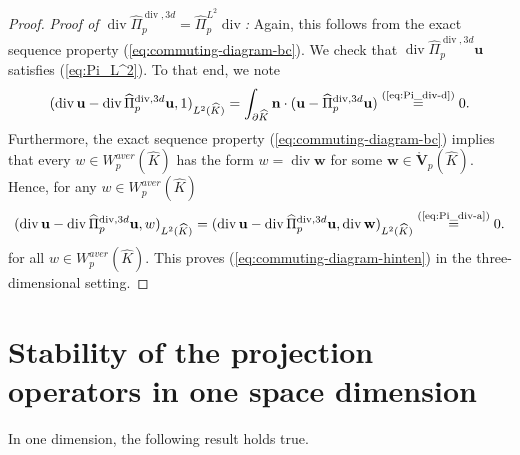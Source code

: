 \documentclass{article}
\newcommand{\hatPidivcom}{\widehat\Pi^{\operatorname*{div},3d}_{p}}
\begin{document}
\begin{proof}
\emph{Proof of $\operatorname*{div}\hatPidivcom=\widehat{\Pi}_{p}^{L^{2}}\operatorname*{div}$:} Again, this 
follows from the exact sequence property (\ref{eq:commuting-diagram-bc}). We check that
$\operatorname*{div}\hatPidivcom\mathbf{u}$
satisfies (\ref{eq:Pi_L^2}). To that end, we note
\begin{equation*}
(\operatorname*{div}{\mathbf{u}}-\operatorname*{div}\hatPidivcom{\mathbf{u}},1)_{L^{2}(\widehat{K})}%
=\int_{\partial\widehat{K}}\mathbf{n}\cdot({\mathbf{u}}-\hatPidivcom{\mathbf{u}})\overset{\text{(\ref{eq:Pi_div-d}%
)}}{=}0.
\end{equation*}
Furthermore, the exact sequence property (\ref{eq:commuting-diagram-bc}) implies 
that every $w\in W^{aver}_{p}(\widehat{K})$ has the form
$w=\operatorname*{div}{\mathbf{w}}$ for some $\mathbf{w}\in\mathring{\mathbf{V}}_{p}(\widehat{K})$. 
Hence,  for any $w \in W^{aver}_p(\widehat{K})$
\[
(\operatorname*{div}{\mathbf{u}}-\operatorname*{div}\hatPidivcom\mathbf{u},w)_{L^{2}(\widehat{K})}%
=(\operatorname*{div}{\mathbf{u}}-\operatorname*{div}\hatPidivcom\mathbf{u},\operatorname*{div}\mathbf{w}%
)_{L^{2}(\widehat{K})}\overset{\text{(\ref{eq:Pi_div-a})}}{=}0. 
\]
for all $w \in W^{aver}_p(\widehat{K})$. 
This proves (\ref{eq:commuting-diagram-hinten}) 
in the three-dimensional setting. 
\end{proof}

\section{Stability of the projection operators in one space dimension}

In one dimension, the following result holds true.
\end{document}
